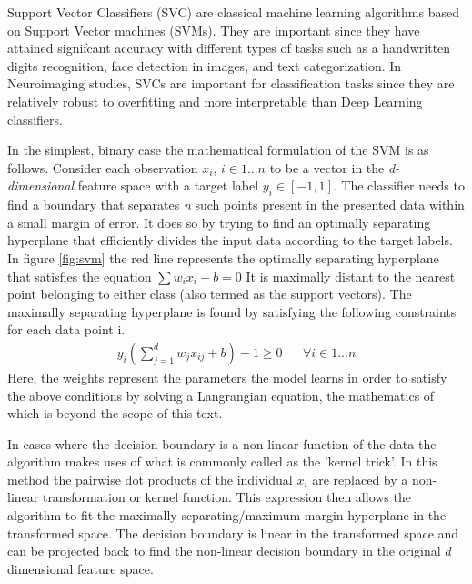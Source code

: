 \documentclass[msthesis.tex]{subfiles}
\begin{document}
Support Vector Classifiers (SVC) are classical machine learning algorithms based on Support Vector machines (SVMs). They are important since they have attained signifcant accuracy with different types of tasks such as a handwritten digits recognition, face detection in images, and text categorization\cite{burges1998a}. In Neuroimaging studies, SVCs are important for classification tasks since they are relatively robust to overfitting and more interpretable than Deep Learning classifiers.

In the simplest, binary case the mathematical formulation of the SVM is as follows. Consider each observation \textbf{$x_i$}, $i\in {1...n}$ to be a vector in the \textit{d-dimensional} feature space with a target label  $y_i\in {[-1,1]}$. The classifier needs to find a boundary that separates \textit{n} such points present in the presented data within a small margin of error.  It does so by trying to find an optimally separating hyperplane that efficiently divides the input data according to the target labels. In figure \autoref{fig:svm} the red line represents the optimally separating hyperplane that satisfies the equation
$ \sum w_i x_i - b = 0$
 It is maximally distant to the nearest point belonging to either class (also termed as the support vectors). The maximally separating hyperplane is found by satisfying the following constraints for each data point i. 
\begin{align}
    y_i(\sum_{j=1}^{d} w_{j} x_{ij}  + b)  - 1\geq 0 && \forall i \in {1...n}
\end{align}
Here, the weights represent the parameters the model learns in order to satisfy the above conditions by solving a Langrangian equation, the mathematics of which is beyond the scope of this text.  

In cases where the decision boundary is a non-linear function of the data the algorithm makes uses of what is commonly called as the 'kernel trick'. In this method the pairwise dot products of the individual $x_i$ are replaced by a non-linear transformation or kernel function. This expression then allows the algorithm to fit the maximally separating/maximum margin hyperplane in the transformed space. The decision boundary is linear in the transformed space and can be projected back to find the non-linear decision boundary in the original $d$ dimensional feature space. 
\end{document}
